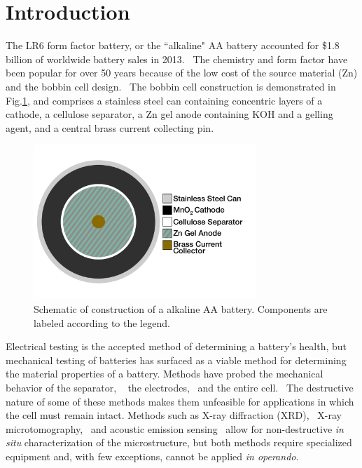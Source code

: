 \section{Introduction}
\label{sec:dbb:intro}

The LR6 form factor {} battery, or the ``alkaline" AA battery accounted for \$1.8 billion of worldwide battery sales in 2013.~\cite{highbeam,ibisworld}  The chemistry and form factor have been popular for over 50 years because of the low cost of the source material (Zn) and the  bobbin cell design.~\cite{karl_patent} The bobbin cell construction is demonstrated in Fig.\ref{fig:aaschem}, and comprises a stainless steel can containing concentric layers of a  cathode, a cellulose separator, a Zn gel anode containing KOH and a gelling agent, and a central brass current collecting pin.

\begin{figure}[htb]
  \centering
    \includegraphics[width=0.75\textwidth]{ch3-dbb/Images/aaschem.png}
    \caption[Schematic of construction of a alkaline AA battery.]{Schematic of construction of a alkaline AA battery. Components are labeled according to the legend.}
    \label{fig:aaschem}
\end{figure}

Electrical testing is the accepted method of determining a battery's health, but mechanical testing of batteries has surfaced as a viable method for determining the material properties of a battery. Methods have probed the mechanical behavior of the separator, ~\cite{cannarella_ion,peabody_separator} the electrodes,~\cite{chen,du_cycling,han,park,striebel} and the entire cell.~\cite{cannarella_stress} The destructive nature of some of these methods makes them unfeasible for applications in which the cell must remain intact. Methods such as X-ray diffraction (XRD),~\cite{gallaway} X-ray microtomography,~\cite{haibel,manke,ebner} and acoustic emission sensing~\cite{etiemble,kalnaus,kircheva,rhodes} allow for non-destructive \textit{in situ} characterization of the microstructure, but both methods require specialized equipment and, with few exceptions, cannot be applied \textit{in operando}.

